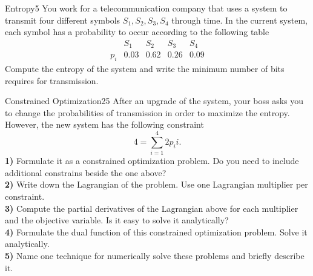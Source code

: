 \newif\ifvimbug
\vimbugfalse

\ifvimbug



\fi

 

\begin{questions}



\begin{question}{Entropy}{5}
You work for a telecommunication company that uses a system to transmit four different symbols ${S_1, S_2, S_3, S_4}$ through time. 
In the current system, each symbol has a probability to occur according to the following table 
\begin{equation*}
\begin{array}{c|c|c|c|c}
 & S_1 & S_2 & S_3 & S_4 \\
\hline
p_i & 0.03    & 0.62    & 0.26    & 0.09
\end{array}
\end{equation*}
Compute the entropy of the system and write the minimum number of bits requires for transmission.

\begin{answer}\end{answer}

\end{question}


\begin{question}{Constrained Optimization}{25}
After an upgrade of the system, your boss asks you to change the probabilities of transmission in order to maximize the entropy. However, the new system has the following constraint
\begin{equation*}
    4 = \sum_{i=1}^4 2p_i i.
\end{equation*}
\textbf{1)} Formulate it as a constrained optimization problem. Do you need to include additional constrains beside the one above?
\\
\textbf{2)} Write down the Lagrangian of the problem. Use one Lagrangian multiplier per constraint.
\\
\textbf{3)} Compute the partial derivatives of the Lagrangian above for each multiplier and the objective variable. Is it easy to solve it analytically? 
\\
\textbf{4)} Formulate the dual function of this constrained optimization problem. Solve it analytically.
\\
\textbf{5)} Name one technique for numerically solve these problems and briefly describe it.


\end{question}
\end{questions}

